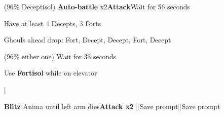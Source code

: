 \begin{mainlist}
	\item {} (96\% Deceptisol) \textbf{Auto-battle} x2\to\textbf{Attack}\to Wait for 56 seconds
	\item Have at least 4 Decepts, 3 Forts
	\item Ghouls ahead drop: Fort, Decept, Decept, Fort, Decept
	\item {} (96\% either one) Wait for 33 seconds
	\item Use \textbf{Fortisol} while on elevator
	\item {}|\skip
	\item {} \textbf{Blitz} Anima until left arm dies\to \textbf{Attack x2} ||Save prompt||Save prompt
\end{mainlist}
